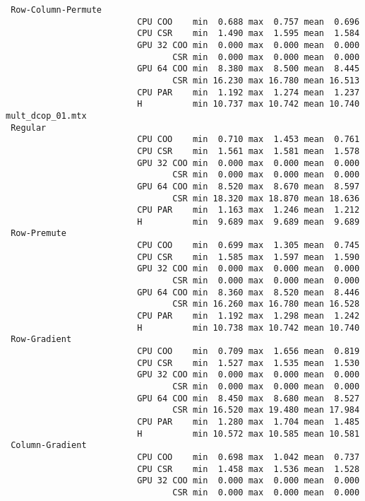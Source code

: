 \begin{verbatim}
 Row-Column-Permute
                          CPU COO    min  0.688 max  0.757 mean  0.696
                          CPU CSR    min  1.490 max  1.595 mean  1.584
                          GPU 32 COO min  0.000 max  0.000 mean  0.000
                                 CSR min  0.000 max  0.000 mean  0.000
                          GPU 64 COO min  8.380 max  8.500 mean  8.445
                                 CSR min 16.230 max 16.780 mean 16.513
                          CPU PAR    min  1.192 max  1.274 mean  1.237
                          H          min 10.737 max 10.742 mean 10.740
mult_dcop_01.mtx
 Regular
                          CPU COO    min  0.710 max  1.453 mean  0.761
                          CPU CSR    min  1.561 max  1.581 mean  1.578
                          GPU 32 COO min  0.000 max  0.000 mean  0.000
                                 CSR min  0.000 max  0.000 mean  0.000
                          GPU 64 COO min  8.520 max  8.670 mean  8.597
                                 CSR min 18.320 max 18.870 mean 18.636
                          CPU PAR    min  1.163 max  1.246 mean  1.212
                          H          min  9.689 max  9.689 mean  9.689
 Row-Premute
                          CPU COO    min  0.699 max  1.305 mean  0.745
                          CPU CSR    min  1.585 max  1.597 mean  1.590
                          GPU 32 COO min  0.000 max  0.000 mean  0.000
                                 CSR min  0.000 max  0.000 mean  0.000
                          GPU 64 COO min  8.360 max  8.520 mean  8.446
                                 CSR min 16.260 max 16.780 mean 16.528
                          CPU PAR    min  1.192 max  1.298 mean  1.242
                          H          min 10.738 max 10.742 mean 10.740
 Row-Gradient
                          CPU COO    min  0.709 max  1.656 mean  0.819
                          CPU CSR    min  1.527 max  1.535 mean  1.530
                          GPU 32 COO min  0.000 max  0.000 mean  0.000
                                 CSR min  0.000 max  0.000 mean  0.000
                          GPU 64 COO min  8.450 max  8.680 mean  8.527
                                 CSR min 16.520 max 19.480 mean 17.984
                          CPU PAR    min  1.280 max  1.704 mean  1.485
                          H          min 10.572 max 10.585 mean 10.581
 Column-Gradient
                          CPU COO    min  0.698 max  1.042 mean  0.737
                          CPU CSR    min  1.458 max  1.536 mean  1.528
                          GPU 32 COO min  0.000 max  0.000 mean  0.000
                                 CSR min  0.000 max  0.000 mean  0.000

\end{verbatim}
